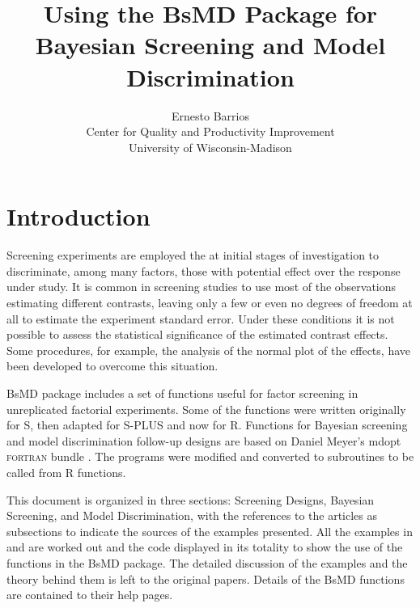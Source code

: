 \documentclass[letterpaper]{article}
\begin{document}

\title{Using the \textsf{BsMD} Package for Bayesian Screening and Model Discrimination}
\author{Ernesto Barrios\\Center for Quality and Productivity Improvement\\
  University of Wisconsin-Madison}
\date{}
\maketitle
\tableofcontents

\section{Introduction}

Screening experiments are employed the at initial stages of investigation to
discriminate, among many factors, those with potential effect over the
response under study. It is common in screening studies to use most of the
observations estimating different contrasts, leaving only a few or even no
degrees of freedom at all to estimate the experiment standard error. Under
these conditions it is not possible to assess the statistical significance
of the estimated contrast effects. Some procedures, for example, the
analysis of the normal plot of the effects, have been developed to overcome
this situation.

\textsf{BsMD} package includes a set of functions useful for factor screening
in unreplicated factorial experiments. Some of the functions were written
originally for \textsf{S}, then adapted for \textsf{S-PLUS} and now for
\textsf{R}. Functions for Bayesian screening and model discrimination
follow-up designs are based on Daniel Meyer's \textsf{mdopt}
\textsc{fortran} bundle \citep{Meyer-1996}. The programs were modified and
converted to subroutines to be called from \textsf{R} functions.


This document is organized in three sections: Screening Designs, Bayesian
Screening, and Model Discrimination, with the references to the articles as
subsections to indicate the sources of the examples presented. All the
examples in \citet{Box&Meyer-1986,Box&Meyer-1993} and
\citet*{Meyer&etal-1996} are worked out and the code displayed in its
totality to show the use of the functions in the \textsf{BsMD} package. The
detailed discussion of the examples and the theory behind them is left to the
original papers. Details of the \textsf{BsMD} functions are contained to
their help pages.
\end{document}
